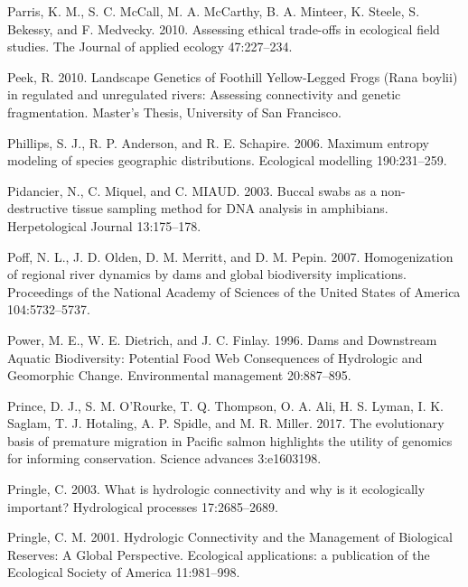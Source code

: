\documentclass[twoside,12pt,final]{ucthesis-CA2012} %
\begin{document}
\begin{ucmainmatter}
\leavevmode\hypertarget{ref-parris_assessing_2010}{}%
Parris, K. M., S. C. McCall, M. A. McCarthy, B. A. Minteer, K. Steele,
S. Bekessy, and F. Medvecky. 2010. Assessing ethical trade-offs in
ecological field studies. The Journal of applied ecology 47:227--234.

\leavevmode\hypertarget{ref-peek_landscape_2010}{}%
Peek, R. 2010. Landscape Genetics of Foothill Yellow-Legged Frogs (Rana
boylii) in regulated and unregulated rivers: Assessing connectivity and
genetic fragmentation. Master's Thesis, University of San Francisco.

\leavevmode\hypertarget{ref-phillips_maximum_2006}{}%
Phillips, S. J., R. P. Anderson, and R. E. Schapire. 2006. Maximum
entropy modeling of species geographic distributions. Ecological
modelling 190:231--259.

\leavevmode\hypertarget{ref-pidancier_buccal_2003}{}%
Pidancier, N., C. Miquel, and C. MIAUD. 2003. Buccal swabs as a
non-destructive tissue sampling method for DNA analysis in amphibians.
Herpetological Journal 13:175--178.

\leavevmode\hypertarget{ref-poff_homogenization_2007}{}%
Poff, N. L., J. D. Olden, D. M. Merritt, and D. M. Pepin. 2007.
Homogenization of regional river dynamics by dams and global
biodiversity implications. Proceedings of the National Academy of
Sciences of the United States of America 104:5732--5737.

\leavevmode\hypertarget{ref-power_dams_1996}{}%
Power, M. E., W. E. Dietrich, and J. C. Finlay. 1996. Dams and
Downstream Aquatic Biodiversity: Potential Food Web Consequences of
Hydrologic and Geomorphic Change. Environmental management 20:887--895.

\leavevmode\hypertarget{ref-prince_evolutionary_2017}{}%
Prince, D. J., S. M. O'Rourke, T. Q. Thompson, O. A. Ali, H. S. Lyman,
I. K. Saglam, T. J. Hotaling, A. P. Spidle, and M. R. Miller. 2017. The
evolutionary basis of premature migration in Pacific salmon highlights
the utility of genomics for informing conservation. Science advances
3:e1603198.

\leavevmode\hypertarget{ref-pringle_what_2003}{}%
Pringle, C. 2003. What is hydrologic connectivity and why is it
ecologically important? Hydrological processes 17:2685--2689.

\leavevmode\hypertarget{ref-pringle_hydrologic_2001}{}%
Pringle, C. M. 2001. Hydrologic Connectivity and the Management of
Biological Reserves: A Global Perspective. Ecological applications: a
publication of the Ecological Society of America 11:981--998.


\end{ucmainmatter}
\end{document}
